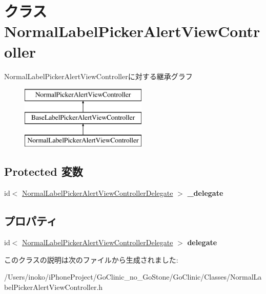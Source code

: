 \hypertarget{interface_normal_label_picker_alert_view_controller}{
\section{クラス NormalLabelPickerAlertViewController}
\label{interface_normal_label_picker_alert_view_controller}
}
NormalLabelPickerAlertViewControllerに対する継承グラフ\begin{figure}[H]
\begin{center}
\leavevmode
\includegraphics[height=3.000000cm]{interface_normal_label_picker_alert_view_controller}
\end{center}
\end{figure}
\subsection*{Protected 変数}
\begin{DoxyCompactItemize}
\item 
\hypertarget{interface_normal_label_picker_alert_view_controller_ad7ca44076584dac0a02e0916d02516e0}{
id$<$ \hyperlink{protocol_normal_label_picker_alert_view_controller_delegate-p}{NormalLabelPickerAlertViewControllerDelegate} $>$ {\bfseries \_\-delegate}}
\label{interface_normal_label_picker_alert_view_controller_ad7ca44076584dac0a02e0916d02516e0}

\end{DoxyCompactItemize}
\subsection*{プロパティ}
\begin{DoxyCompactItemize}
\item 
\hypertarget{interface_normal_label_picker_alert_view_controller_a76757b0a682a13a9fcaa08258a25ade6}{
id$<$ \hyperlink{protocol_normal_label_picker_alert_view_controller_delegate-p}{NormalLabelPickerAlertViewControllerDelegate} $>$ {\bfseries delegate}}
\label{interface_normal_label_picker_alert_view_controller_a76757b0a682a13a9fcaa08258a25ade6}

\end{DoxyCompactItemize}


このクラスの説明は次のファイルから生成されました:\begin{DoxyCompactItemize}
\item 
/Users/inoko/iPhoneProject/GoClinic\_\-no\_\-GoStone/GoClinic/Classes/NormalLabelPickerAlertViewController.h\end{DoxyCompactItemize}
